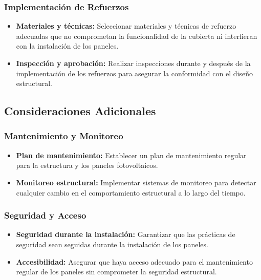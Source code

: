 \documentclass[a4paper,12pt]{article}
\begin{document}
\begin{Form}
\subsubsection*{Implementación de Refuerzos}
\begin{itemize}
    \item \textbf{Materiales y técnicas:} Seleccionar materiales y técnicas de refuerzo adecuadas que no comprometan la funcionalidad de la cubierta ni interfieran con la instalación de los paneles.
    \item \textbf{Inspección y aprobación:} Realizar inspecciones durante y después de la implementación de los refuerzos para asegurar la conformidad con el diseño estructural.
\end{itemize}

\subsection*{Consideraciones Adicionales}

\subsubsection*{Mantenimiento y Monitoreo}
\begin{itemize}
    \item \textbf{Plan de mantenimiento:} Establecer un plan de mantenimiento regular para la estructura y los paneles fotovoltaicos.
    \item \textbf{Monitoreo estructural:} Implementar\cite{idaepctcon} sistemas de monitoreo para detectar cualquier cambio en el comportamiento estructural a lo largo del tiempo.
\end{itemize}

\subsubsection*{Seguridad y Acceso}
\begin{itemize}
    \item \textbf{Seguridad durante la instalación:} Garantizar que las prácticas de seguridad sean seguidas durante la instalación de los paneles.
    \item \textbf{Accesibilidad:} Asegurar que haya acceso adecuado para el mantenimiento regular de los paneles sin comprometer la seguridad estructural.
\end{itemize}



\end{Form}
\end{document}
